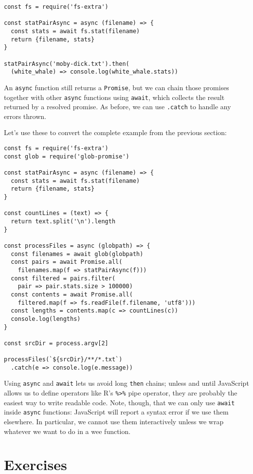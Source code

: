 \begin{verbatim}
const fs = require('fs-extra')

const statPairAsync = async (filename) => {
  const stats = await fs.stat(filename)
  return {filename, stats}
}

statPairAsync('moby-dick.txt').then(
  (white_whale) => console.log(white_whale.stats))
\end{verbatim}

An \texttt{async} function still returns a \texttt{Promise},
but we can chain those promises together with other \texttt{async} functions using \texttt{await},
which collects the result returned by a resolved promise.
As before, we can use \texttt{.catch} to handle any errors thrown.

Let's use these to convert the complete example from the previous section:

\begin{verbatim}
const fs = require('fs-extra')
const glob = require('glob-promise')

const statPairAsync = async (filename) => {
  const stats = await fs.stat(filename)
  return {filename, stats}
}

const countLines = (text) => {
  return text.split('\n').length
}

const processFiles = async (globpath) => {
  const filenames = await glob(globpath)
  const pairs = await Promise.all(
    filenames.map(f => statPairAsync(f)))
  const filtered = pairs.filter(
    pair => pair.stats.size > 100000)
  const contents = await Promise.all(
    filtered.map(f => fs.readFile(f.filename, 'utf8')))
  const lengths = contents.map(c => countLines(c))
  console.log(lengths)
}

const srcDir = process.argv[2]

processFiles(`${srcDir}/**/*.txt`)
  .catch(e => console.log(e.message))
\end{verbatim}

Using \texttt{async} and \texttt{await} lets us avoid long \texttt{then} chains;
unless and until JavaScript allows us to define operators like R's \texttt{\%\textgreater{}\%} pipe operator,
they are probably the easiest way to write readable code.
Note,
though,
that we can only use \texttt{await} inside \texttt{async} functions:
JavaScript will report a syntax error if we use them elsewhere.
In particular,
we cannot use them interactively unless we wrap whatever we want to do in a wee function.

\section{Exercises}\label{s:promises-exercises}

